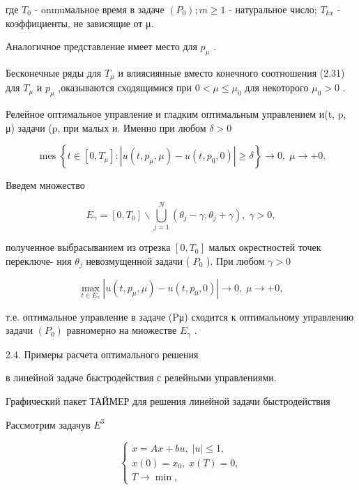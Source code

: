\documentclass[10pt]{article}
\begin{document}
где \({T}_{0}\) - onmuмальное время в задаче \(\left( {P}_{0}\right) ;m \geq  1\) - натуральное число; \({T}_{kx}\) - коэффициенты, не зависящие от μ.

Аналогичное представление имеет место для \({p}_{\mu }\) .

Бесконечные ряды для \({T}_{\mu }\) и влиясиянные вместо конечного соотношения (2.31) для \({T}_{\mu }\) и \({p}_{\mu }\) ,оказываются сходящимися при \(0 < \mu  \leq  {\mu }_{0}\) для некоторого \({\mu }_{0} > 0\) .

Релейное оптимальное управление и гладким оптимальным управлением и(t, p, μ) задачи (p, при малых и. Именно при любом \(\delta  > 0\)

\[
\left. {\operatorname{mes}\left\{  {t \in  \left[  {0,{T}_{\mu }}\right]   : \left| {u\left( {t,{p}_{\mu },\mu }\right)  - u\left( {t,{p}_{0},0}\right) }\right|  \geq  \delta }\right. }\right\}   \rightarrow  0,\;\mu  \rightarrow   + 0.
\]

Введем множество

\[
{E}_{\gamma } = \left[  {0,{T}_{0}}\right]   \smallsetminus  \mathop{\bigcup }\limits_{{j = 1}}^{N}\left( {{\theta }_{j} - \gamma ,{\theta }_{j} + \gamma }\right) ,\;\gamma  > 0,
\]

полученное выбрасыванием из отрезка \(\left[  {0,{T}_{0}}\right]\) малых окрестностей точек переключе- ния \({\theta }_{j}\) невозмущенной задачи ( \({P}_{0}\) ). При любом \(\gamma  > 0\)

\[
\mathop{\max }\limits_{{t \in  {E}_{\gamma }}}\left| {u\left( {t,{p}_{\mu },\mu }\right)  - u\left( {t,{p}_{0},0}\right) }\right|  \rightarrow  0,\;\mu  \rightarrow   + 0,
\]

т.е. оптимальное управление в задаче (Pμ) сходится к оптимальному управлению задачи \(\left( {P}_{0}\right)\) равномерно на множестве \({E}_{\gamma }\) .

2.4. Примеры расчета оптимального решения

в линейной задаче быстродействия с релейными управлениями.

Графический пакет ТАЙМЕР для решения линейной задачи быстродействия

Рассмотрим задачув \({E}^{3}\)

\[
\left\{  \begin{array}{l} \dot{x} = {Ax} + {bu},\;\left| u\right|  \leq  1, \\  x\left( 0\right)  = {x}_{0},\;x\left( T\right)  = 0, \\  T \rightarrow  \min , \end{array}\right. \tag{2.32}
\]
\end{document}
